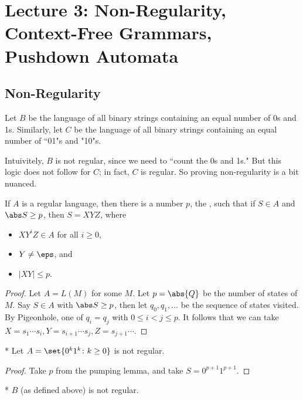 \section*{Lecture 3: Non-Regularity, Context-Free Grammars, Pushdown Automata}
\setcounter{section}{3}
\setcounter{subsection}{3}
\setcounter{defn}{0}
\setcounter{defncontainer}{0}

\subsection{Non-Regularity}

Let $B$ be the language of all binary strings containing an equal number of 0s and 1s.
Similarly, let $C$ be the language of all binary strings containing an equal number of ``01"s and "10"s.

Intuivitely, $B$ is not regular, since we need to ``count the 0s and 1s." But this logic does not follow for $C$; in fact, $C$ is regular.
So proving non-regularity is a bit nuanced.

\begin{lem}
	If $A$ is a regular language, then there is a number $p$, the , such that if $S\in A$ and $\abs S \geq p$, then $S = XYZ$, where
	\begin{itemize}
		\item $XY^iZ\in A$ for all $i \geq 0$,
		\item $Y\neq \eps$, and
		\item $|XY|\leq p$.
	\end{itemize}
\end{lem}

\begin{proof}
	Let $A = L(M)$ for some $M$. Let $p = \abs{Q}$ be the number of states of $M$.
	Say $S\in A$ with $\abs S \geq p$, then let $q_0, q_1, \ldots$ be the sequence of states visited.
	By Pigeonhole, one of $q_i = q_j$ with $0 \leq i < j \leq p$.
	It follows that we can take $X = s_1\cdots s_i, Y = s_{i+1}\cdots s_j, Z = s_{j+1}\cdots$.
\end{proof}

\begin{cor}*
	Let $A = \set{0^k1^k \colon k\geq 0}$ is not regular.
\end{cor}

\begin{proof}
	Take $p$ from the pumping lemma, and take $S = 0^{p+1}1^{p+1}$.
\end{proof}

\begin{cor}*
	$B$ (as defined above) is not regular.
\end{cor}

